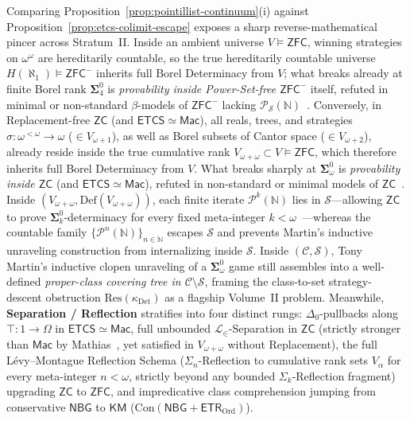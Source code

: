 \begin{remark}\label{rem:martin-borel-coalgebra}%
%
Comparing Proposition~\ref{prop:pointillist-continuum}(i) against Proposition~\ref{prop:etcs-colimit-escape} exposes a sharp reverse-mathematical pincer across Stratum~II. Inside an ambient universe $V \models \mathsf{ZFC}$, winning strategies on $\omega^\omega$ are hereditarily countable, so the true hereditarily countable universe $H(\aleph_1) \models \mathsf{ZFC}^-$ inherits full Borel Determinacy from $V$; what breaks already at finite Borel rank $\boldsymbol{\Sigma}^0_4$ is \emph{provability inside Power-Set-free $\mathsf{ZFC}^-$} itself, refuted in minimal or non-standard $\beta$-models of $\mathsf{ZFC}^-$ lacking $\mathcal{P}_{\mathcal{S}}(\mathbb{N})$~\cite{Friedman71,Martin75,MontalbanShore12,GitmanHamkinsJohnstone16}. Conversely, in Replacement-free $\mathsf{ZC}$ (and $\mathsf{ETCS} \simeq \mathsf{Mac}$), all reals, trees, and strategies $\sigma : \omega^{<\omega} \to \omega$ ($\in V_{\omega+1}$), as well as Borel subsets of Cantor space ($\in V_{\omega+2}$), already reside inside the true cumulative rank $V_{\omega+\omega} \subset V \models \mathsf{ZFC}$, which therefore inherits full Borel Determinacy from $V$. What breaks sharply at $\boldsymbol{\Sigma}^0_\omega$ is \emph{provability inside $\mathsf{ZC}$} (and $\mathsf{ETCS} \simeq \mathsf{Mac}$), refuted in non-standard or minimal models of $\mathsf{ZC}$~\cite{Friedman71}. Inside $(V_{\omega+\omega}, \mathrm{Def}(V_{\omega+\omega}))$, each finite iterate $\mathcal{P}^k(\mathbb{N})$ lies in $\mathcal{S}$---allowing $\mathsf{ZC}$ to prove $\boldsymbol{\Sigma}^0_k$-determinacy for every fixed meta-integer $k < \omega$~\cite{Martin75}---whereas the countable family $\{\mathcal{P}^n(\mathbb{N})\}_{n \in \mathbb{N}}$ escapes $\mathcal{S}$ and prevents Martin's inductive unraveling construction from internalizing inside $\mathcal{S}$. Inside $(\mathcal{C}, \mathcal{S})$, Tony Martin's inductive clopen unraveling of a $\boldsymbol{\Sigma}^0_\omega$ game still assembles into a well-defined \emph{proper-class covering tree in $\mathcal{C} \setminus \mathcal{S}$}, framing the class-to-set strategy-descent obstruction $\mathrm{Res}(\kappa_{\mathrm{Det}})$ as a flagship Volume~II problem. Meanwhile, \textbf{Separation / Reflection} stratifies into four distinct rungs: $\Delta_0$-pullbacks along $\top : 1 \to \Omega$ in $\mathsf{ETCS} \simeq \mathsf{Mac}$, full unbounded $\mathcal{L}_\in$-Separation in $\mathsf{ZC}$ (strictly stronger than $\mathsf{Mac}$ by Mathias~\cite{Mathias01}, yet satisfied in $V_{\omega+\omega}$ without Replacement), the full L\'evy--Montague Reflection Schema ($\Sigma_n$-Reflection to cumulative rank sets $V_\alpha$ for every meta-integer $n < \omega$, strictly beyond any bounded $\Sigma_k$-Reflection fragment) upgrading $\mathsf{ZC}$ to $\mathsf{ZFC}$, and impredicative class comprehension jumping from conservative $\mathsf{NBG}$ to $\mathsf{KM}$ ($\mathrm{Con}(\mathsf{NBG}+\mathsf{ETR}_{\mathrm{Ord}})$).
\end{remark}

